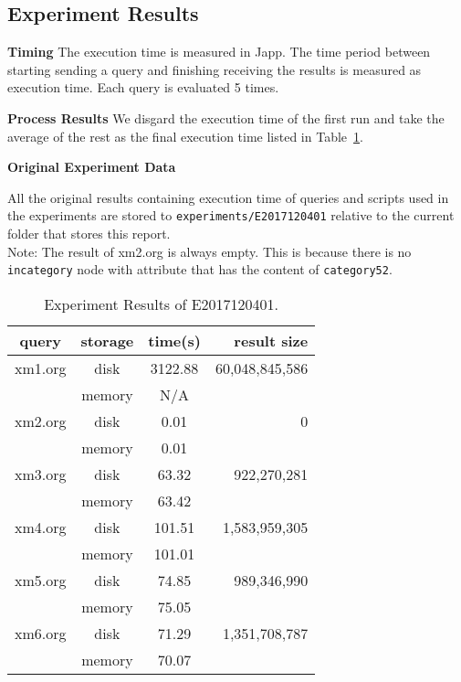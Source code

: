 \subsection{Experiment Results}

\textbf{Timing} The execution time is measured in Japp. The time period between
starting sending a query and finishing receiving the results is measured as
execution time. Each query is evaluated 5 times. 

\textbf{Process Results}
We disgard the execution time of the first run and take the average of the rest as
the final execution time listed in Table~\ref{table:E2017120401_1}.


\textbf{Original Experiment Data}

All the original results containing execution time of queries and scripts used 
in the experiments  are stored to \texttt{experiments/E2017120401} relative to
the current folder that stores this report.\\

Note: The result of xm2.org is always empty. This is because there is no \texttt{incategory} node 
with attribute that has the content of \texttt{category52}. 


\begin{table}[t]
	\caption{Experiment Results of E2017120401.}
	\label{table:E2017120401_1}
	\centering
	\begin{tabular}{c|c|c|r}
		\hline \hline
		query  & storage & time(s)  &   result size  \\
		\hline \hline
		xm1.org &  disk   & 3122.88  & 60,048,845,586 \\
		& memory  &    N/A   &  \\
		\hline
		xm2.org &  disk   &    0.01  &              0 \\
		& memory  &    0.01  &  \\
		\hline
		xm3.org &  disk   &  63.32  &    922,270,281 \\
		& memory  &  63.42  &  \\
		\hline
		xm4.org &  disk   &  101.51  &  1,583,959,305 \\
		& memory  &  101.01  &  \\
		\hline
		xm5.org &  disk   &  74.85  &    989,346,990 \\
		& memory  &  75.05   &   \\
		\hline
		xm6.org &  disk   &  71.29   &  1,351,708,787 \\
		& memory  &  70.07   &   \\
		\hline \hline
	\end{tabular}
\end{table}





